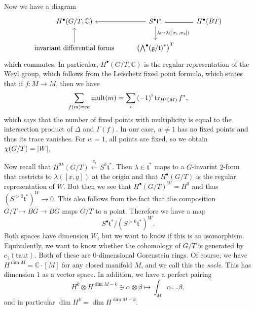 \documentclass[leqno, openany]{memoir}
\theoremstyle{definition}
\theoremstyle{remark}
\theoremstyle{plain}
\theoremstyle{definition}
\theoremstyle{remark}
\newcommand{\C}{\mathbb{C}}
\newcommand{\mf}[1]{\mathfrak{#1}}
\begin{document}
Now we have a diagram
\begin{equation*}
\begin{tikzcd}
    H^{\bullet}(G/T, \C) & S^{\bullet} \mf{t}^* \ar[equal]{r} \ar{l} \ar{d}{\lambda \mapsto \lambda([x_1, x_2])} & H^{\bullet}(BT) \\
    \text{invariant differential forms} \ar{u} & {\qty({\bigwedge}^{\bullet}{(\mf{g}/\mf{t})}^*)}^T
\end{tikzcd}
\end{equation*}
which commutes. In particular, $H^{\bullet}(G/T, \C)$ is the regular representation of the Weyl group, which follows from the Lefschetz fixed point formula, which states that if $f \colon M \to M$, then we have
\[ \sum_{f(m) = m} \operatorname{mult}(m) = \sum_i {(-1)}^i \tr_{H^i(M)} f^*, \]
which says that the number of fixed points with multiplicity is equal to the intersection product of $\Delta$ and $\Gamma(f)$. In our case, $w \neq 1$ has no fixed points and thus its trace vanishes. For $w = 1$, all points are fixed, so we obtain $\chi(G/T) = \abs{W}$.

Now recall that $H^{2k}(G/T) \xleftarrow{c_i} S^k \mf{t}^*$. Then $\lambda \in \mf{t}^*$ maps to a $G$-invarint $2$-form that restricts to $\lambda([x,y])$ at the origin and that $H^{\bullet}(G/T)$ is the regular representation of $W$. But then we see that ${H^{\bullet}(G/T)}^W = H^0$ and thus ${(S^{>0} \mf{t}^*)}^W \to 0$. This also follows from the fact that the composition $G/T \to BG \to BG$ maps $G/T$ to a point. Therefore we have a map
\[ S^{\bullet} \mf{t}^* / {(S^{>0} \mf{t}^*)}^W. \]
Both spaces have dimension $W$, but we want to know if this is an isomorphism. Equivalently, we want to know whether the cohomology of $G/T$ is generated by $c_1(\text{taut})$. Both of these are $0$-dimensional Gorenstein rings. Of course, we have $H^{\dim M} = \C \cdot [M]$ for any closed manifold $M$, and we call this the \textit{socle}. This has dimension $1$ as a vector space. In addition, we have a perfect pairing
\[ H^k \otimes H^{\dim M - k} \ni \alpha \otimes \beta \mapsto \int_M \alpha \smile \beta, \]
and in particular $\dim H^k = \dim H^{\dim M - k}$. 
\end{document}
